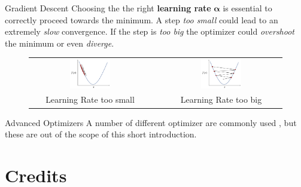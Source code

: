 \documentclass[aspectratio=169]{beamer}
\begin{document}

\begin{frame}{Gradient Descent}
Choosing the the right \textbf{learning rate} $\bm{\alpha}$ is essential to correctly proceed towards the minimum. A step \textit{too small} could lead to an extremely \textit{slow} convergence. If the step is \textit{too big} the optimizer could \textit{overshoot} the minimum or even \textit{diverge}. 
\begin{figure}
\begin{tabular}{ccc}
\includegraphics[width=0.35\textwidth]{img/sgd/lr_too_small.png} &
\quad &
\includegraphics[width=0.35\textwidth]{img/sgd/lr_too_big.png}\\
Learning Rate too small & & Learning Rate too big
\end{tabular}
\end{figure}

\end{frame}


\begin{frame}{Advanced Optimizers}
A number of different optimizer \cite{kingma2014adam,duchi2011adaptive,zeiler2012adadelta} are commonly used , but these are out of the scope of this short introduction.
\end{frame}




\section{Credits}

\end{document}
